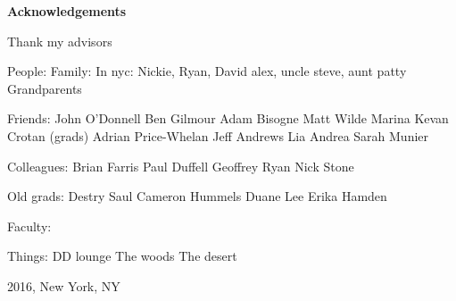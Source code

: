 \newpage

\begin{center}
    {\large \bf Acknowledgements }
\end{center}

\vspace{-0.2cm}

Thank my advisors





People:
Family:
In nyc: Nickie, Ryan, David
alex, uncle steve, aunt patty
Grandparents

Friends:
John O'Donnell
Ben Gilmour
Adam Bisogne
Matt Wilde
Marina
Kevan Crotan
(grads)
Adrian Price-Whelan
Jeff Andrews
Lia 
Andrea
Sarah
Munier



Colleagues:
Brian Farris
Paul Duffell
Geoffrey Ryan
Nick Stone

Old grads:
Destry Saul
Cameron Hummels
Duane Lee
Erika Hamden

Faculty:


Things:
DD lounge
The woods 
The desert

\vspace{1.8cm}
2016, New York, NY

